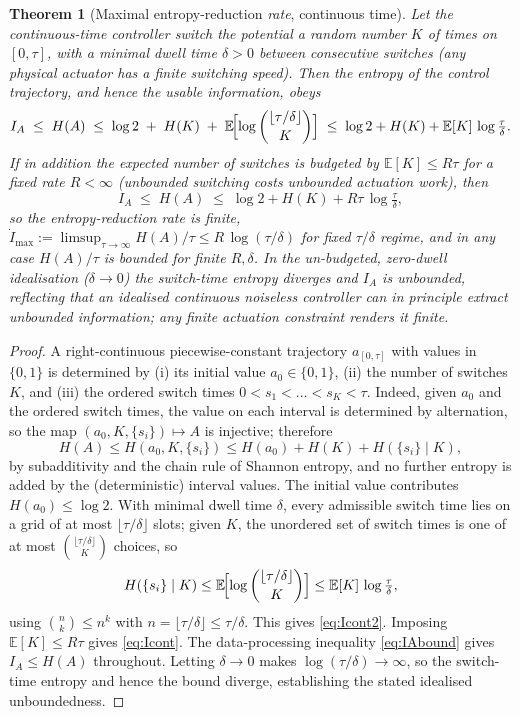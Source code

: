 \documentclass{amsart}
\newtheorem{theorem}{Theorem}
\theoremstyle{definition}
\newcommand{\E}{\mathbb{E}}
\begin{document}
\begin{theorem}[Maximal entropy-reduction \emph{rate}, continuous time]
\label{thm:Imax-cont}
Let the continuous-time controller switch the potential a random number $K$ of
times on $[0,\tau]$, with a minimal dwell time $\delta>0$ between consecutive
switches (any physical actuator has a finite switching speed). Then the
entropy of the control trajectory, and hence the usable information, obeys
\begin{equation}\label{eq:Icont2}
I_A\;\le\;H(A)\;\le\; \log 2 \;+\; H(K)\;+\;
\E\!\Bigl[\log\binom{\lfloor\tau/\delta\rfloor}{K}\Bigr]
\;\le\;\log 2 + H(K) + \E[K]\,\log\tfrac{\tau}{\delta}.
\end{equation}
If in addition the expected number of switches is budgeted by $\E[K]\le R\tau$
for a fixed rate $R<\infty$ (unbounded switching costs unbounded actuation
work), then
\begin{equation}\label{eq:Icont}
I_A\;\le\;H(A)\;\le\; \log2 + H(K) + R\tau\,\log\tfrac{\tau}{\delta},
\end{equation}
so the entropy-reduction \emph{rate} is finite,
$\dot I_{\max}:=\limsup_{\tau\to\infty}H(A)/\tau \le R\,\log(\tau/\delta)$ for
fixed $\tau/\delta$ regime, and in any case $H(A)/\tau$ is bounded for finite
$R,\delta$. In the un-budgeted, zero-dwell idealisation ($\delta\to0$) the
switch-time entropy diverges and $I_A$ is unbounded, reflecting that an
idealised continuous noiseless controller can in principle extract unbounded
information; any finite actuation constraint renders it finite.
\end{theorem}

\begin{proof}
A right-continuous piecewise-constant trajectory $a_{[0,\tau]}$ with values in
$\{0,1\}$ is determined by (i) its initial value $a_0\in\{0,1\}$, (ii) the
number of switches $K$, and (iii) the ordered switch times
$0<s_1<\dots<s_K<\tau$. Indeed, given $a_0$ and the ordered switch times, the
value on each interval is determined by alternation, so the map
$(a_0,K,\{s_i\})\mapsto A$ is injective; therefore
\[
H(A)\le H(a_0,K,\{s_i\})\le H(a_0)+H(K)+H(\{s_i\}\mid K),
\]
by subadditivity and the chain rule of Shannon entropy, and no further entropy
is added by the (deterministic) interval values. The initial value contributes
$H(a_0)\le\log2$. With minimal dwell time $\delta$, every admissible switch
time lies on a grid of at most $\lfloor\tau/\delta\rfloor$ slots; given $K$,
the unordered set of switch times is one of at most
$\binom{\lfloor\tau/\delta\rfloor}{K}$ choices, so
\[
H(\{s_i\}\mid K)\le \E\!\Bigl[\log\binom{\lfloor\tau/\delta\rfloor}{K}\Bigr]
\le \E[K]\,\log\tfrac{\tau}{\delta},
\]
using $\binom{n}{k}\le n^{k}$ with $n=\lfloor\tau/\delta\rfloor\le\tau/\delta$.
This gives \eqref{eq:Icont2}. Imposing $\E[K]\le R\tau$ gives \eqref{eq:Icont}.
The data-processing inequality \eqref{eq:IAbound} gives $I_A\le H(A)$
throughout. Letting $\delta\to0$ makes $\log(\tau/\delta)\to\infty$, so the
switch-time entropy and hence the bound diverge, establishing the stated
idealised unboundedness.
\end{proof}
\end{document}
